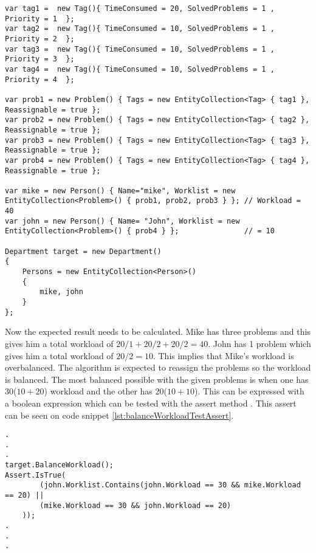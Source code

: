 \begin{lstlisting}[style=sourceCode, caption=\myCaption{The arrange phase of the unit test of balance workload}, label=lst:balanceWorkloadTest2arrange]
var tag1 =  new Tag(){ TimeConsumed = 20, SolvedProblems = 1 , Priority = 1  };  
var tag2 =  new Tag(){ TimeConsumed = 10, SolvedProblems = 1 , Priority = 2  }; 
var tag3 =  new Tag(){ TimeConsumed = 10, SolvedProblems = 1 , Priority = 3  }; 
var tag4 =  new Tag(){ TimeConsumed = 10, SolvedProblems = 1 , Priority = 4  }; 

var prob1 = new Problem() { Tags = new EntityCollection<Tag> { tag1 }, Reassignable = true };
var prob2 = new Problem() { Tags = new EntityCollection<Tag> { tag2 }, Reassignable = true };
var prob3 = new Problem() { Tags = new EntityCollection<Tag> { tag3 }, Reassignable = true };
var prob4 = new Problem() { Tags = new EntityCollection<Tag> { tag4 }, Reassignable = true };
   
var mike = new Person() { Name="mike", Worklist = new EntityCollection<Problem>() { prob1, prob2, prob3 } }; // Workload = 40
var john = new Person() { Name= "John", Worklist = new EntityCollection<Problem>() { prob4 } };               // = 10

Department target = new Department()
{
    Persons = new EntityCollection<Person>()
    {
        mike, john
    }
};
\end{lstlisting}

Now the expected result needs to be calculated. 
Mike has three problems and this gives him a total workload of $20/1 + 20/2 + 20/2 = 40$. 
John has 1 problem which gives him a total workload of $20 / 2 = 10$. 
This implies that Mike's workload is overbalanced. 
The algorithm is expected to reassign the problems so the workload is balanced. 
The most balanced possible with the given problems is when one has 30($10 + 20$) workload and the other has 20($10 + 10$). 
This can be expressed with a boolean expression which can be tested with the assert method . 
This assert can be seen on code snippet \ref{lst:balanceWorkloadTestAssert}.

\begin{lstlisting}[style=sourceCode, caption=\myCaption{An example unit test which tests a specific instance of the balanceWorkload method.}, label=lst:balanceWorkloadTestAssert]
.
.
.
target.BalanceWorkload();
Assert.IsTrue(
		(john.Worklist.Contains(john.Workload == 30 && mike.Workload == 20) || 
		(mike.Workload == 30 && john.Workload == 20)
	));
.
.
.
\end{lstlisting}

